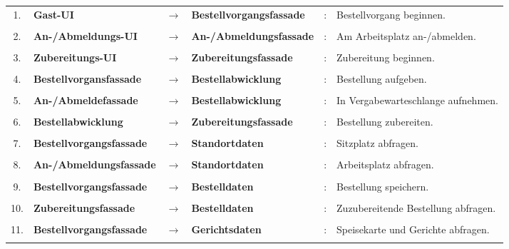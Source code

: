 \begin{tabu} to \linewidth {clcllX}
1.
  &\textbf{Gast-UI}
  &$\rightarrow$
  &\textbf{Bestellvorgangsfassade}
  &:
  &Bestellvorgang beginnen.
  \\\\
2.
  &\textbf{An-/Abmeldungs-UI}
  &$\rightarrow$
  &\textbf{An-/Abmeldungs\-fassade}
  &:
  &Am Arbeitsplatz an-/abmelden.
  \\\\
3.
  &\textbf{Zubereitungs-UI}
  &$\rightarrow$
  &\textbf{Zubereitungsfassade}
  &:
  &Zubereitung beginnen.
  \\\\
4.
  &\textbf{Bestellvorgansfassade}
  &$\rightarrow$
  &\textbf{Bestellabwicklung}
  &:
  &Bestellung aufgeben.
  \\\\
5.
  &\textbf{An-/Abmeldefassade}
  &$\rightarrow$
  &\textbf{Bestellabwicklung}
  &:
  &In Vergabewarteschlange aufnehmen.
  \\\\
6.
  &\textbf{Bestellabwicklung}
  &$\rightarrow$
  &\textbf{Zubereitungsfassade}
  &:
  &Bestellung zubereiten.
  \\\\
7.
  &\textbf{Bestellvorgangsfassade}
  &$\rightarrow$
  &\textbf{Standortdaten}
  &:
  &Sitzplatz abfragen.
  \\\\
8.
  &\textbf{An-/Abmeldungs\-fassade}
  &$\rightarrow$
  &\textbf{Standortdaten}
  &:
  &Arbeitsplatz abfragen.
  \\\\
9.
  &\textbf{Bestellvorgangsfassade}
  &$\rightarrow$
  &\textbf{Bestelldaten}
  &:
  &Bestellung speichern.
  \\\\
10.
  &\textbf{Zubereitungsfassade}
  &$\rightarrow$
  &\textbf{Bestelldaten}
  &:
  &Zuzubereitende Bestellung abfragen.
  \\\\
11.
  &\textbf{Bestellvorgangsfassade}
  &$\rightarrow$
  &\textbf{Gerichtsdaten}
  &:
  &Speisekarte und Gerichte abfragen.
  \\\\

\end{tabu}
